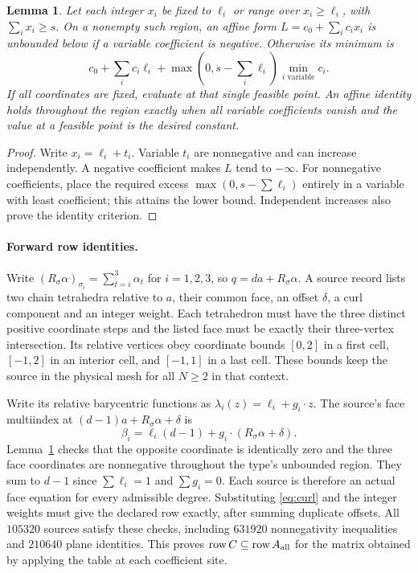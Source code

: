 \documentclass[11pt]{article}
\newtheorem{lemma}[theorem]{Lemma}
\theoremstyle{remark}
\DeclareMathOperator{\row}{row}
\begin{document}
\begin{lemma}\label{lem:affine}
Let each integer $x_i$ be fixed to $\ell_i$ or range over $x_i\ge\ell_i$,
with $\sum_i x_i\ge s$. On a nonempty such region, an affine form
$L=c_0+\sum_i c_ix_i$ is unbounded below if a variable coefficient is
negative. Otherwise its minimum is
\begin{equation}\label{eq:affine-min}
 c_0+\sum_i c_i\ell_i+
       \max(0,s-\sum_i\ell_i)\min_{i\text{ variable}}c_i.
\end{equation}
If all coordinates are fixed, evaluate at that single feasible point.
An affine identity holds throughout the region exactly when all variable
coefficients vanish and the value at a feasible point is the desired constant.
\end{lemma}
\begin{proof}
Write $x_i=\ell_i+t_i$. Variable $t_i$ are nonnegative and can increase
independently. A negative coefficient makes $L$ tend to $-\infty$.
For nonnegative coefficients, place the required excess
$\max(0,s-\sum\ell_i)$ entirely in a variable with least coefficient;
this attains the lower bound. Independent increases also prove the
identity criterion.
\end{proof}

\paragraph{Forward row identities.}
Write $(R_\sigma\alpha)_{\sigma_i}=\sum_{t=i}^3\alpha_t$ for
$i=1,2,3$, so $q=da+R_\sigma\alpha$. A source record lists two chain
tetrahedra relative to $a$, their common face, an offset $\delta$, a curl
component and an integer weight. Each tetrahedron must have the three
distinct positive coordinate steps and the listed face must be exactly
their three-vertex intersection. Its relative vertices obey coordinate
bounds $[0,2]$ in a first cell, $[-1,2]$ in an interior cell, and
$[-1,1]$ in a last cell. These bounds keep the source in the physical
mesh for all $N\ge2$ in that context.

Write its relative barycentric functions as
$\lambda_i(z)=\ell_i+g_i\cdot z$. The source's face multiindex at
$(d-1)a+R_\sigma\alpha+\delta$ is
\begin{equation}\label{eq:source-beta}
 \beta_i=\ell_i(d-1)+g_i\cdot(R_\sigma\alpha+\delta).
\end{equation}
Lemma~\ref{lem:affine} checks that the opposite coordinate is identically
zero and the three face coordinates are nonnegative throughout the type's
unbounded region. They sum to $d-1$ since $\sum\ell_i=1$ and
$\sum g_i=0$. Each source is therefore an actual face equation for
every admissible degree. Substituting \eqref{eq:curl} and the integer
weights must give the declared row exactly, after summing duplicate
offsets. All $105320$ sources satisfy these checks, including $631920$
nonnegativity inequalities and $210640$ plane identities. This proves
$\row C\subseteq\row A_{\rm all}$ for the matrix obtained by applying
the table at each coefficient site.
\end{document}
